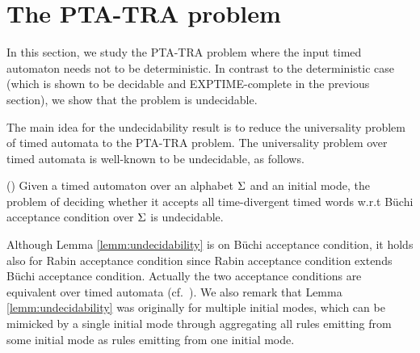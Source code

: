 \vspace{-1.8em}
\section{The PTA-TRA problem}
\vspace{-1em}
In this section, we study the PTA-TRA problem where the input timed automaton needs not to be deterministic.
In contrast to the deterministic case (which is shown to be decidable and EXPTIME-complete in the previous section), 
we show that the problem is undecidable.

\smallskip
{} The main idea for the undecidability result is to reduce the universality problem of timed automata to the PTA-TRA problem. The universality problem over timed automata is well-known to be undecidable, as follows.

%
%
\begin{lemma}{(\cite[Theorem 5.2]{DBLP:journals/tcs/AlurD94})}\label{lemm:undecidability}
Given a timed automaton over an alphabet $\Sigma$ and an initial mode, the problem of deciding whether it accepts all time-divergent timed words w.r.t B\"{u}chi acceptance condition over $\Sigma$ is undecidable.
\end{lemma}
%
Although Lemma \ref{lemm:undecidability} is on  B\"{u}chi acceptance condition, it holds also for Rabin acceptance condition since Rabin acceptance condition extends  B\"{u}chi acceptance condition.
Actually the two acceptance conditions are equivalent over timed automata (cf.~\cite[Theorem 3.20]{DBLP:journals/tcs/AlurD94}). We also remark that Lemma \ref{lemm:undecidability} was originally for multiple initial modes, which can be mimicked by a single initial mode through aggregating all rules emitting from some initial mode as rules emitting from one initial mode. 


